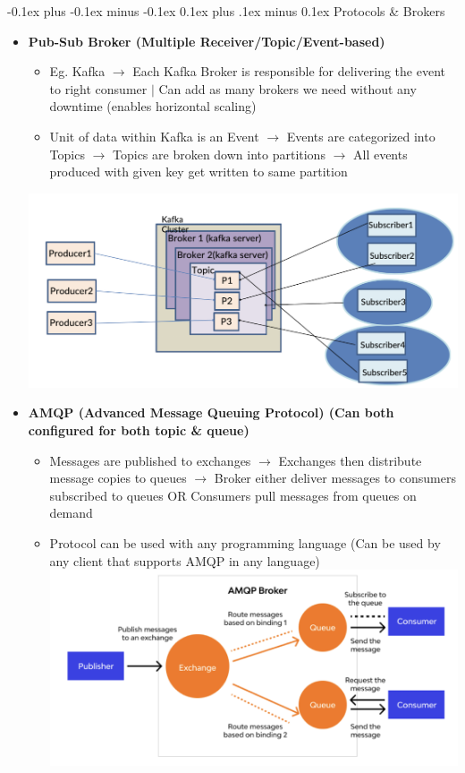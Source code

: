 \documentclass[landscape]{article}
\makeatletter
\renewcommand{\subsection}{\@startsection{subsection}{2}{0mm}%
  {-0.1ex plus -0.1ex minus -0.1ex}%
  {0.1ex plus .1ex minus 0.1ex}%
{\normalfont\scriptsize\bfseries}}
\makeatother
\begin{document}
\begin{multicols*}{5}
    \subsection{Protocols \& Brokers}
    \begin{itemize}
      \item \textbf{Pub-Sub Broker (Multiple Receiver/Topic/Event-based)}
      \begin{itemize}
        \item Eg. Kafka $\rightarrow$ Each Kafka Broker is responsible for delivering the event to right consumer $|$ Can add as many brokers we need without any downtime (enables horizontal scaling)
        \item Unit of data within Kafka is an Event $\rightarrow$ Events are categorized into Topics $\rightarrow$ Topics are broken down into partitions $\rightarrow$ All events produced with given key get written to same partition
      \end{itemize}
      \includegraphics[width=0.7\linewidth]{7_kafka.png}
      \item \textbf{AMQP (Advanced Message Queuing Protocol) (Can both configured for both topic \& queue)}
      \begin{itemize}
        \item Messages are published to exchanges $\rightarrow$ Exchanges then distribute message copies to queues $\rightarrow$ Broker either deliver messages to consumers subscribed to queues OR Consumers pull messages from queues on demand
        \item Protocol can be used with any programming language (Can be used by any client that supports AMQP in any language)
        \includegraphics[width=0.75\linewidth]{8_AMQP_Broker.png}

\end{itemize}
\end{itemize}
\end{multicols*}
\end{document}
